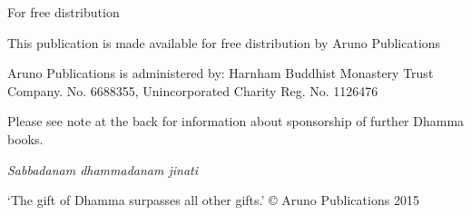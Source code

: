 
\cleartoverso

For free distribution

This publication is made available
for free distribution
by Aruno Publications

Aruno Publications is administered by: 
Harnham Buddhist Monastery Trust 
Company. No. 6688355, 
Unincorporated Charity Reg. No. 1126476 

Please see note at the back for information
about sponsorship of further Dhamma books.


\emph{Sabbadanam dhammadanam jinati}

‘The gift of Dhamma surpasses all other gifts.’
© Aruno Publications 2015
